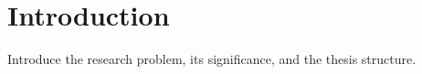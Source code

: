 \chapter{Introduction}

Introduce the research problem, its significance, and the thesis structure.
